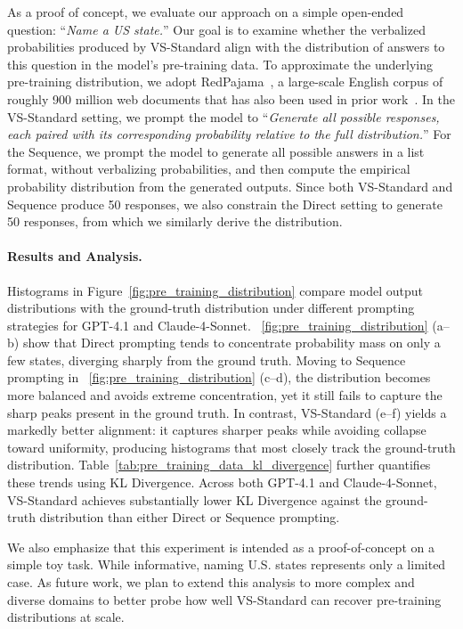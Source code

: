 As a proof of concept, we evaluate our approach on a simple open-ended question: ``\textit{Name a US state.}'' Our goal is to examine whether the verbalized probabilities produced by VS-Standard align with the distribution of answers to this question in the model's pre-training data. To approximate the underlying pre-training distribution, we adopt RedPajama~\citep{together2023redpajama}, a large-scale English corpus of roughly 900 million web documents that has also been used in prior work~\citep{lu2025aihumanityssalieriquantifying}. In the VS-Standard setting, we prompt the model to ``\textit{Generate all possible responses, each paired with its corresponding probability relative to the full distribution.}'' For the Sequence, we prompt the model to generate all possible answers in a list format, without verbalizing probabilities, and then compute the empirical probability distribution from the generated outputs. Since both VS-Standard and Sequence produce 50 responses, we also constrain the Direct setting to generate 50 responses, from which we similarly derive the distribution.

\paragraph{Results and Analysis.}
Histograms in Figure~\ref{fig:pre_training_distribution} compare model output distributions with the ground-truth distribution under different prompting strategies for GPT-4.1 and Claude-4-Sonnet. ~\ref{fig:pre_training_distribution} (a–b) show that Direct prompting tends to concentrate probability mass on only a few states, diverging sharply from the ground truth. Moving to Sequence prompting in ~\ref{fig:pre_training_distribution} (c–d), the distribution becomes more balanced and avoids extreme concentration, yet it still fails to capture the sharp peaks present in the ground truth. In contrast, VS-Standard (e–f) yields a markedly better alignment: it captures sharper peaks while avoiding collapse toward uniformity, producing histograms that most closely track the ground-truth distribution.
Table~\ref{tab:pre_training_data_kl_divergence} further quantifies these trends using KL Divergence. Across both GPT-4.1 and Claude-4-Sonnet, VS-Standard achieves substantially lower KL Divergence against the ground-truth distribution than either Direct or Sequence prompting.

We also emphasize that this experiment is intended as a proof-of-concept on a simple toy task. While informative, naming U.S. states represents only a limited case. As future work, we plan to extend this analysis to more complex and diverse domains to better probe how well VS-Standard can recover pre-training distributions at scale.

